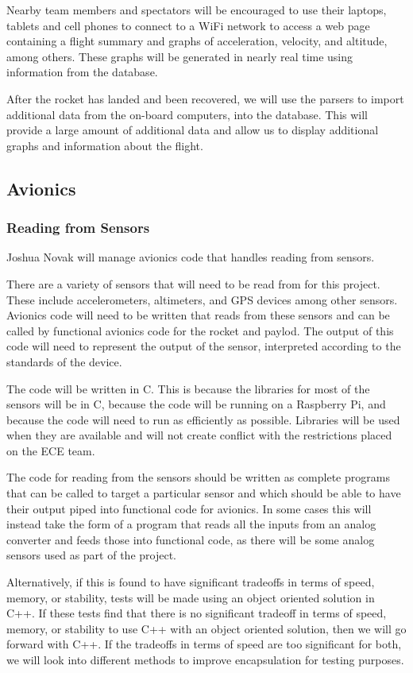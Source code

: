 \documentclass[onecolumn, draftclsnofoot, 10pt, compsoc]{IEEEtran}
\begin{document}
Nearby team members and spectators will be encouraged to use their laptops, tablets and cell phones to connect to a WiFi network to access a web page containing a flight summary and graphs of acceleration, velocity, and altitude, among others.  These graphs will be generated in nearly real time using information from the database.

After the rocket has landed and been recovered, we will use the parsers to import additional data from the on-board computers, into the database.  This will provide a large amount of additional data and allow us to display additional graphs and information about the flight.

\subsection{Avionics}

\subsubsection{Reading from Sensors}

Joshua Novak will manage avionics code that handles reading from sensors.

There are a variety of sensors that will need to be read from for this project. These include accelerometers, altimeters, and GPS devices among other sensors. Avionics code will need to be written that reads from these sensors and can be called by functional avionics code for the rocket and paylod. The output of this code will need to represent the output of the sensor, interpreted according to the standards of the device. 

The code will be written in C. This is because the libraries for most of the sensors will be in C, because the code will be running on a Raspberry Pi, and because the code will need to run as efficiently as possible. Libraries will be used when they are available and will not create conflict with the restrictions placed on the ECE team. 

The code for reading from the sensors should be written as complete programs that can be called to target a particular sensor and which should be able to have their output piped into functional code for avionics. In some cases this will instead take the form of a program that reads all the inputs from an analog converter and feeds those into functional code, as there will be some analog sensors used as part of the project.

Alternatively, if this is found to have significant tradeoffs in terms of speed, memory, or stability, tests will be made using an object oriented solution in C++. If these tests find that there is no significant tradeoff in terms of speed, memory, or stability to use C++ with an object oriented solution, then we will go forward with C++. If the tradeoffs in terms of speed are too significant for both, we will look into different methods to improve encapsulation for testing purposes.
\end{document}
